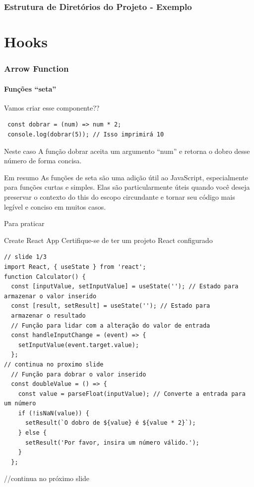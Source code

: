 \documentclass[13pt, xcolor={dvipsnames,svgnames}, portuguese]{beamer}
\begin{document}
\begin{frame}
\frametitle{Estrutura de Diretórios do Projeto - Exemplo}
\end{frame}

\section{Hooks}

\begin{frame}[fragile]
\frametitle{Arrow Function}
\framesubtitle{Funções ``seta''}
Vamos criar esse componente??
\begin{verbatim}
 const dobrar = (num) => num * 2;
 console.log(dobrar(5)); // Isso imprimirá 10
\end{verbatim}
\pause
\begin{exampleblock}{Neste caso}
 A função dobrar aceita um argumento ``num'' e retorna o dobro desse número de forma concisa.
\end{exampleblock}
\pause
\begin{block}{Em resumo}
As funções de seta são uma adição útil ao JavaScript, especialmente para funções curtas e simples. Elas são particularmente úteis quando você deseja preservar o contexto do this do escopo circundante e tornar seu código mais legível e conciso em muitos casos.

\end{block}
\end{frame}
\begin{frame}[fragile]{Para praticar}
\begin{exampleblock}{Create React App}
Certifique-se de ter um projeto React configurado
\end{exampleblock}
\begin{verbatim}
// slide 1/3
import React, { useState } from 'react';
function Calculator() {
  const [inputValue, setInputValue] = useState(''); // Estado para armazenar o valor inserido
  const [result, setResult] = useState(''); // Estado para
  armazenar o resultado
  // Função para lidar com a alteração do valor de entrada
  const handleInputChange = (event) => {
    setInputValue(event.target.value);
  };
// continua no proximo slide
  // Função para dobrar o valor inserido
  const doubleValue = () => {
    const value = parseFloat(inputValue); // Converte a entrada para um número
    if (!isNaN(value)) {
      setResult(`O dobro de ${value} é ${value * 2}`);
    } else {
      setResult('Por favor, insira um número válido.');
    }
  };

\end{verbatim}
//continua no próximo slide
\end{frame}
\end{document}
